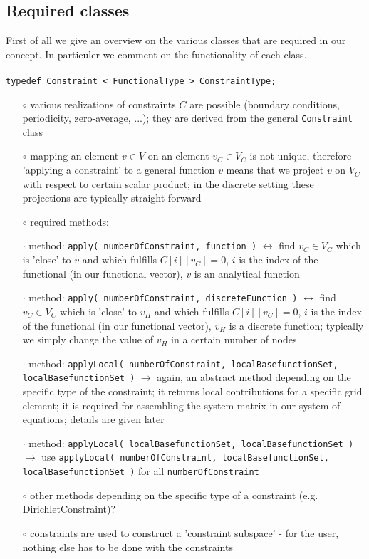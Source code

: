 \documentclass[a4paper,11pt]{article}
\numberwithin{equation}{section}
\begin{document}
\subsection{Required classes}

First of all we give an overview on the various classes that are required in our concept. In particuler we comment on the functionality of each class.\\
\\
{\tt typedef Constraint < FunctionalType > ConstraintType;}
\begin{itemize}
\item[$\circ$] various realizations of constraints $C$ are possible (boundary conditions, periodicity, zero-average, ...); they are derived from the general {\tt Constraint} class
\item[$\circ$] mapping an element $v\in V$ on an element $v_C \in V_C$ is not unique, therefore 'applying a constraint' to a general function $v$ means that we project $v$ on $V_C$ with respect to certain scalar product; in the discrete setting these projections are typically straight forward
\item[$\circ$] required methods:
\item[$\cdot$] method: {\tt apply( numberOfConstraint, function )} $\leftrightarrow$ find $v_C \in V_C$ which is 'close' to $v$ and which fulfills $C[i][v_C]=0$, $i$ is the index of the functional (in our functional vector), $v$ is an analytical function
\item[$\cdot$] method: {\tt apply( numberOfConstraint, discreteFunction )} $\leftrightarrow$ find $v_C \in V_C$ which is 'close' to $v_H$ and which fulfills $C[i][v_C]=0$, $i$ is the index of the functional (in our functional vector), $v_H$ is a discrete function; typically we simply change the value of $v_H$ in a certain number of nodes
\item[$\cdot$] method: {\tt applyLocal( numberOfConstraint, localBasefunctionSet, \\ localBasefunctionSet )} $\rightarrow$ again, an abstract method depending on the specific type of the constraint; it returns local contributions for a specific grid element; it is required for assembling the system matrix in our system of equations; details are given later
\item[$\cdot$] method: {\tt applyLocal( localBasefunctionSet, localBasefunctionSet )} $\rightarrow$ use {\tt applyLocal( numberOfConstraint, localBasefunctionSet, \\ localBasefunctionSet )} for all {\tt numberOfConstraint}
\item[$\circ$] other methods depending on the specific type of a constraint (e.g. DirichletConstraint)?
\item[$\circ$] constraints are used to construct a 'constraint subspace' - for the user, nothing else has to be done with the constraints
\end{itemize}
\end{document}
